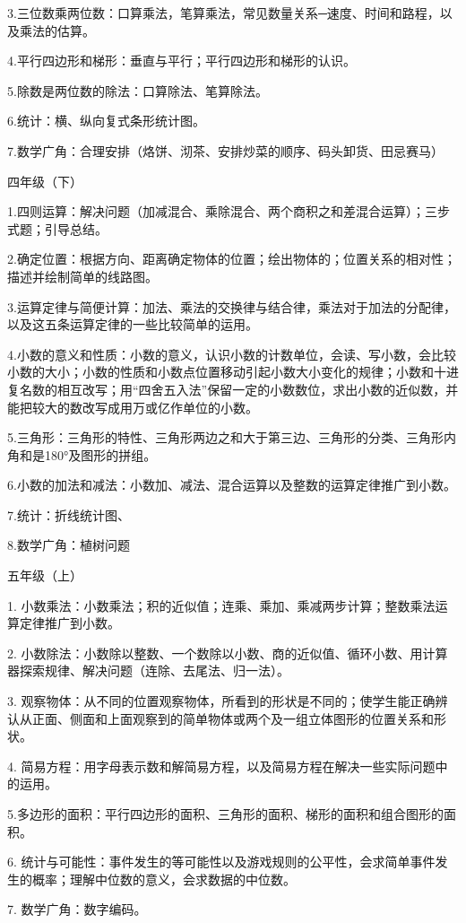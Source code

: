 3.三位数乘两位数：口算乘法，笔算乘法，常见数量关系─速度、时间和路程，以及乘法的估算。

4.平行四边形和梯形：垂直与平行；平行四边形和梯形的认识。

5.除数是两位数的除法：口算除法、笔算除法。

6.统计：横、纵向复式条形统计图。

7.数学广角：合理安排（烙饼、沏茶、安排炒菜的顺序、码头卸货、田忌赛马）

四年级（下）

1.四则运算：解决问题（加减混合、乘除混合、两个商积之和差混合运算）；三步式题；引导总结。

2.确定位置：根据方向、距离确定物体的位置；绘出物体的；位置关系的相对性；描述并绘制简单的线路图。

3.运算定律与简便计算：加法、乘法的交换律与结合律，乘法对于加法的分配律，以及这五条运算定律的一些比较简单的运用。

4.小数的意义和性质：小数的意义，认识小数的计数单位，会读、写小数，会比较小数的大小；小数的性质和小数点位置移动引起小数大小变化的规律；小数和十进复名数的相互改写；用“四舍五入法”保留一定的小数数位，求出小数的近似数，并能把较大的数改写成用万或亿作单位的小数。

5.三角形：三角形的特性、三角形两边之和大于第三边、三角形的分类、三角形内角和是180°及图形的拼组。

6.小数的加法和减法：小数加、减法、混合运算以及整数的运算定律推广到小数。

7.统计：折线统计图、

8.数学广角：植树问题

五年级（上）

1. 小数乘法：小数乘法；积的近似值；连乘、乘加、乘减两步计算；整数乘法运算定律推广到小数。

2. 小数除法：小数除以整数、一个数除以小数、商的近似值、循环小数、用计算器探索规律、解决问题（连除、去尾法、归一法）。

3. 观察物体：从不同的位置观察物体，所看到的形状是不同的；使学生能正确辨认从正面、侧面和上面观察到的简单物体或两个及一组立体图形的位置关系和形状。

4. 简易方程：用字母表示数和解简易方程，以及简易方程在解决一些实际问题中的运用。

5.多边形的面积：平行四边形的面积、三角形的面积、梯形的面积和组合图形的面积。

6. 统计与可能性：事件发生的等可能性以及游戏规则的公平性，会求简单事件发生的概率；理解中位数的意义，会求数据的中位数。

7. 数学广角：数字编码。


